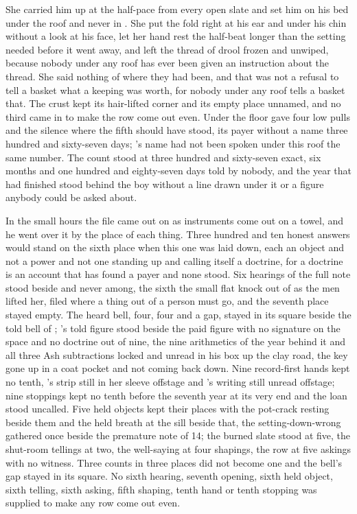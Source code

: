She carried him up at the half-pace from every open slate and set him on his bed under the roof and never in . She put the fold right at his ear and under his chin without a look at his face, let her hand rest the half-beat longer than the setting needed before it went away, and left the thread of drool frozen and unwiped, because nobody under any roof has ever been given an instruction about the thread. She said nothing of where they had been, and that was not a refusal to tell a basket what a keeping was worth, for nobody under any roof tells a basket that. The crust kept its hair-lifted corner and its empty place unnamed, and no third came in to make the row come out even. Under the floor  gave four low pulls and the silence where the fifth should have stood, its payer without a name three hundred and sixty-seven days; 's name had not been spoken under this roof the same number. The count stood at three hundred and sixty-seven exact, six months and one hundred and eighty-seven days told by nobody, and the year that had finished stood behind the boy without a line drawn under it or a figure anybody could be asked about.

In the small hours the file came out on  as instruments come out on a towel, and he went over it by the place of each thing. Three hundred and ten honest answers would stand on the sixth place when this one was laid down, each an object and not a power and not one standing up and calling itself a doctrine, for a doctrine is an account that has found a payer and none stood. Six hearings of the full note stood beside and never among, the sixth the small flat knock out of  as the men lifted her, filed where a thing out of a person must go, and the seventh place stayed empty. The heard bell, four, four and a gap, stayed in its square beside the told bell of ; 's told figure stood beside the paid figure with no signature on the space and no doctrine out of nine, the nine arithmetics of the year behind it and all three Ash subtractions locked and unread in his box up the clay road, the key gone up in a coat pocket and not coming back down. Nine record-first hands kept no tenth, 's strip still in her sleeve offstage and 's writing still unread offstage; nine stoppings kept no tenth before the seventh year at its very end and the loan stood uncalled. Five held objects kept their places with the pot-crack resting beside them and the held breath at the sill beside that, the setting-down-wrong gathered once beside the premature note of  14; the burned slate stood at five, the shut-room tellings at two, the well-saying at four shapings, the row at five askings with no witness. Three counts in three places did not become one and the bell's gap stayed in its square. No sixth hearing, seventh opening, sixth held object, sixth telling, sixth asking, fifth shaping, tenth hand or tenth stopping was supplied to make any row come out even.

